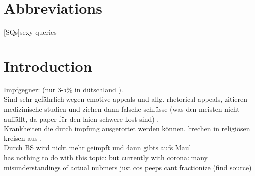 \documentclass[12pt,a4paper,twoside]{article}
\begin{document}
\newpage
\tableofcontents
\newpage

\pagestyle{headings}

\newpage


\section*{Abbreviations}
\begin{acronym}[KPMG]%
	[SQs]{sexy queries}
\end{acronym}

\newpage

\listoffigures
\newpage

\section{Introduction}
Impfgegner: (nur 3-5\% in dütschland \cite{Meyer2004}).\\
Sind sehr gefährlich wegen emotive appeals und allg. rhetorical appeals, zitieren medizinische studien und ziehen dann falsche schlüsse (was den meisten nicht auffällt, da paper für den laien schwere kost sind) \cite{Davies2002}.\\
Krankheiten die durch impfung ausgerottet werden können, brechen in religiösen kreisen aus \cite{Novotny1988}.\\
Durch BS wird nicht mehr geimpft und dann gibts aufs Maul \cite{Pincock2004}\\
has nothing to do with this topic: but currently with corona: many misunderstandings of actual nubmers just cos peeps cant fractionize (find source)
%	
\end{document}
